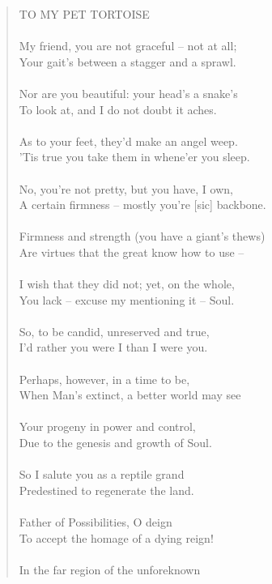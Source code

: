 \documentclass[11pt]{article}
\begin{document}
\begin{quote}
  TO MY PET TORTOISE \\
  \\
  My friend, you are not graceful -- not at all; \\
  Your gait's between a stagger and a sprawl. \\
 \\
  Nor are you beautiful:  your head's a snake's \\
  To look at, and I do not doubt it aches. \\
 \\
  As to your feet, they'd make an angel weep. \\
  'Tis true you take them in whene'er you sleep. \\
 \\
  No, you're not pretty, but you have, I own, \\
  A certain firmness -- mostly you're [sic] backbone. \\
 \\
  Firmness and strength (you have a giant's thews) \\
  Are virtues that the great know how to use -- \\
 \\
  I wish that they did not; yet, on the whole, \\
  You lack -- excuse my mentioning it -- Soul. \\
 \\
  So, to be candid, unreserved and true, \\
  I'd rather you were I than I were you. \\
 \\
  Perhaps, however, in a time to be, \\
  When Man's extinct, a better world may see \\
 \\
  Your progeny in power and control, \\
  Due to the genesis and growth of Soul. \\
 \\
  So I salute you as a reptile grand \\
  Predestined to regenerate the land. \\
 \\
  Father of Possibilities, O deign \\
  To accept the homage of a dying reign! \\
 \\
  In the far region of the unforeknown \\

\end{quote}
\end{document}
